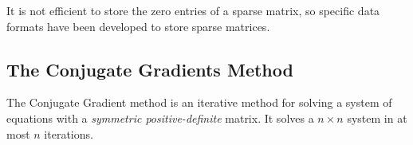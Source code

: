 It is not efficient to store the zero entries of a sparse matrix, so specific data formats have been developed to store sparse matrices.


%
%
\subsection{The Conjugate Gradients Method}

The Conjugate Gradient method is an iterative method for solving a system of equations with a \emph{symmetric positive-definite} matrix. It solves a $n \times n$ system in at most $n$ iterations.
 












